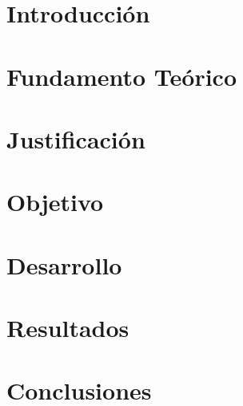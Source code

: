\documentclass{article}
\begin{document}
\hypersetup{pdfborder=0 0 0}



\setcounter{page}{1}

\tableofcontents

\newpage
\setcounter{page}{1}

\section{Introducción}

\newpage
\section{Fundamento Teórico}

\section{Justificación}

\section{Objetivo}

\newpage
\section{Desarrollo}

\newpage
\section{Resultados}

\section{Conclusiones}



%

%
\end{document}

